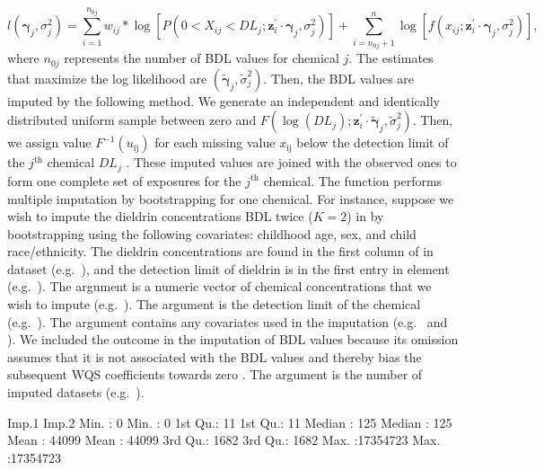 \[l(\boldsymbol{\gamma}_{j}, \sigma^2_j) = \sum_{i=1}^{n_{0j}} w_{ij} * \log \left [ P \left (0 < X_{ij} < DL_{j}; \boldsymbol{z}_i^\prime \cdot \boldsymbol{\gamma}_{j},\sigma^2_j \right) \right ] + \sum_{i=n_{0j}+1}^n \log \left[ f( x_{ij}; \boldsymbol{z}_i^\prime \cdot \boldsymbol{\gamma}_{j}, \sigma^2_j) \right],\]
where \(n_{0j}\) represents the number of BDL values for chemical \(j\).
The estimates that maximize the log likelihood are
\(\left({\tilde{\boldsymbol{\gamma}}}_{j},\tilde{\sigma}^2_j \right)\).
Then, the BDL values are imputed by the following method. We generate an
independent and identically distributed uniform sample between zero and
\(F \left( \log(DL_j); \boldsymbol{z}_i^\prime \cdot \tilde{\boldsymbol{\gamma}}_j, \tilde{\sigma}^2_j \right )\).
Then, we assign value \(F^{- 1} \left( u_{\text{ij}} \right)\) for each
missing value \(x_{\text{ij}}\) below the detection limit of the
\(j^{\text{th}}\) chemical \(DL_{j}\)
\citep{lubinEpidemiologicEvaluationMeasurement2004}. These imputed
values are joined with the observed ones to form one complete set of
exposures for the \(j^{\text{th}}\) chemical. The 
function performs multiple imputation by bootstrapping for one chemical.
For instance, suppose we wish to impute the dieldrin concentrations BDL
twice (\(K = 2\)) in  by bootstrapping using the
following covariates: childhood age, sex, and child race/ethnicity. The
dieldrin concentrations are found in the first column of  in
 dataset (e.g.~), and the
detection limit of dieldrin is in the first entry in  element
(e.g.~). The  argument is a numeric
vector of chemical concentrations that we wish to impute
(e.g.~). The  argument is the
detection limit of the chemical (e.g.~). The
 argument contains any covariates used in the imputation
(e.g.~ and ). We
included the outcome in the imputation of BDL values because its
omission assumes that it is not associated with the BDL values and
thereby bias the subsequent WQS coefficients towards zero
\citep{forerMissingData2014, barnardMultipleImputation2015}. The
 argument is the number of imputed datasets (e.g.~).

\begin{Schunk}
\begin{Soutput}
     Imp.1              Imp.2         
 Min.   :       0   Min.   :       0  
 1st Qu.:      11   1st Qu.:      11  
 Median :     125   Median :     125  
 Mean   :   44099   Mean   :   44099  
 3rd Qu.:    1682   3rd Qu.:    1682  
 Max.   :17354723   Max.   :17354723  
\end{Soutput}
\end{Schunk}

